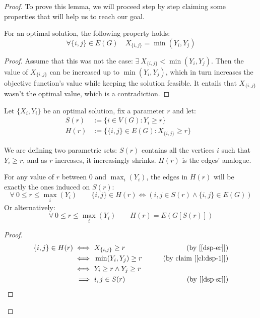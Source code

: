 \begin{proof}
    To prove this lemma, we will proceed step by step claiming some properties that will help us to reach our goal.
    
    \begin{claim}\label{cl:dsp-1}
        For an optimal solution, the following property holds:
        \[
            \forall \{i, j\} \in E(G) \quad X_{\{i, j\}} = \min(Y_i, Y_j)
        \]
    \end{claim}
    \begin{proof}
        Assume that this was not the case: $\exists\ X_{\{i, j\}} < \min(Y_i, Y_j)$. Then the value of $X_{\{i, j\}}$ can be increased up to $\min(Y_i, Y_j)$, which in turn increases the objective function's value while keeping the solution feasible. It entails that $X_{\{i, j\}}$ wasn't the optimal value, which is a contradiction.
    \end{proof}

    Let $\{X_i, Y_i\}$ be an optimal solution, fix a parameter $r$ and let:
    \begin{align}
        S(r) &:= \{ i \in V(G) : Y_i \geq r\}                   & \label{dsp-sr} \\
        H(r) &:= \{ \{i, j\} \in E(G) : X_{\{i, j\}} \geq r\}   & \label{dsp-er}
    \end{align}

    We are defining two parametric sets: $S(r)$ contains all the vertices $i$ such that $Y_i \geq r$, and as $r$ increases, it increasingly shrinks. $H(r)$ is the edges' analogue.
    
    \begin{claim}\label{cl:dsp-2}
        For any value of $r$ between $0$ and $\max_i(Y_i)$, the edges in $H(r)$ will be exactly the ones induced on $S(r)$:
        \[
            \forall\ 0 \leq r \leq \max_i(Y_i) \qquad \{i, j\} \in H(r) \iff (i, j \in S(r) \wedge \{i, j\} \in E(G))
        \]
        Or alternatively:
        \[
            \forall\ 0 \leq r \leq \max_i(Y_i) \qquad H(r) = E(G[S(r)])
        \]
    \end{claim}

    \begin{proof}
        \begin{align*}
                       \{i, j\} \in H(r) 
            \iff&\     X_{\{i, j\}} \geq r          & \tag{by [\ref{dsp-er}]} \\
            \iff&\     \min(Y_i, Y_j) \geq r        & \tag{by claim [\ref{cl:dsp-1}]} \\
            \iff&\     Y_i \geq r \wedge Y_j \geq r & \\
            \implies&\ i, j \in S(r)                & \tag{by [\ref{dsp-sr}]}
        \end{align*}


\end{proof}
\end{proof}
